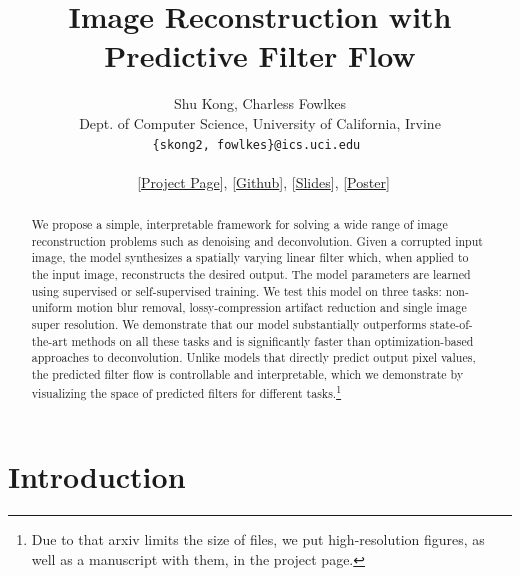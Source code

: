 \documentclass[10pt,twocolumn,letterpaper]{article}
\begin{document}
\title{Image Reconstruction with Predictive Filter Flow}


\author{Shu Kong, Charless Fowlkes\\
Dept. of Computer Science, University of California, Irvine\\
\texttt{\{skong2, fowlkes\}@ics.uci.edu } \\ \\
  \ [\href{https://www.ics.uci.edu/~skong2/pff.html}{Project Page}],
[\href{https://github.com/aimerykong/predictive-filter-flow}{Github}],
[\href{http://www.ics.uci.edu/~skong2/slides/predictive_filter_flow_slides.pdf}{Slides}],
[\href{http://www.ics.uci.edu/~skong2/slides/predictive_filter_flow_poster.pdf}{Poster}]
}


\maketitle

\begin{abstract}
We propose a simple, interpretable framework for solving a wide range of image
reconstruction problems such as denoising and deconvolution.  Given a
corrupted input image, the model synthesizes a spatially varying linear filter
which, when applied to the input image, reconstructs the desired output. The
model parameters are learned using supervised or self-supervised training.
We test this model on three tasks: non-uniform motion blur removal,
lossy-compression artifact reduction and single image super resolution.  We
demonstrate that our model substantially outperforms state-of-the-art methods
on all these tasks and is significantly faster than optimization-based
approaches to deconvolution.  Unlike models that directly predict output pixel
values, the predicted filter flow is controllable and interpretable, which we
demonstrate by visualizing the space of predicted filters for different tasks.\footnote{
Due to that arxiv limits the size of files, we put
high-resolution figures, as well as a manuscript with them, in the project page.}
\end{abstract}


\section{Introduction}
\end{document}
